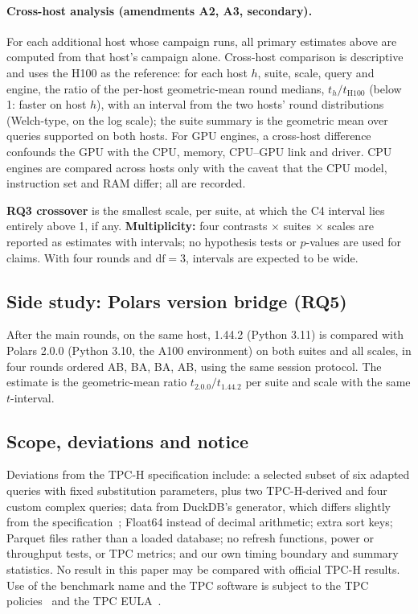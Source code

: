 \documentclass[11pt]{article}
\begin{document}
\paragraph{Cross-host analysis (amendments A2, A3, secondary).} For each
additional host whose campaign runs, all primary estimates above are computed
from that host's campaign alone. Cross-host comparison is descriptive and uses
the H100 as the reference: for each host $h$, suite, scale, query and engine,
the ratio of the per-host geometric-mean round medians,
$t_{h}/t_{\mathrm{H100}}$ (below 1: faster on host $h$), with an interval from
the two hosts' round distributions (Welch-type, on the log scale); the suite
summary is the geometric mean over queries supported on both hosts. For GPU
engines, a cross-host difference confounds the GPU with the CPU, memory, CPU--GPU
link and driver. CPU engines are compared across hosts only with the caveat
that the CPU model, instruction set and RAM differ; all are recorded.

\textbf{RQ3 crossover} is the smallest scale, per suite, at which the C4
interval lies entirely above 1, if any. \textbf{Multiplicity:} four contrasts
$\times$ suites $\times$ scales are reported as estimates with intervals; no
hypothesis tests or $p$-values are used for claims. With four rounds and
$\text{df}=3$, intervals are expected to be wide.

\subsection{Side study: Polars version bridge (RQ5)}
\label{sec:bridge-design}
After the main rounds, on the same host, \polarscpu{} 1.44.2 (Python 3.11) is
compared with Polars 2.0.0 (Python 3.10, the A100 environment) on both suites
and all scales, in four rounds ordered AB, BA, BA, AB, using the same session
protocol. The estimate is the geometric-mean ratio
$t_{2.0.0} / t_{1.44.2}$ per suite and scale with the same $t$-interval.

\subsection{Scope, deviations and notice}
\label{sec:scope}
\tpcdisclaimer{} Deviations from the TPC-H specification include: a selected
subset of six adapted queries with fixed substitution parameters, plus two
TPC-H-derived and four custom complex queries; data from DuckDB's generator,
which differs slightly from the specification~\citep{duckdb_tpch_ext};
Float64 instead of decimal arithmetic; extra sort keys; Parquet files rather
than a loaded database; no refresh functions, power or throughput tests, or
TPC metrics; and our own timing boundary and summary statistics. No result in
this paper may be compared with official TPC-H results. Use of the benchmark
name and the TPC software is subject to the TPC
policies~\citep{tpcpolicies620,tpcfairuse2019} and the TPC
EULA~\citep{tpceula22}.
\end{document}

